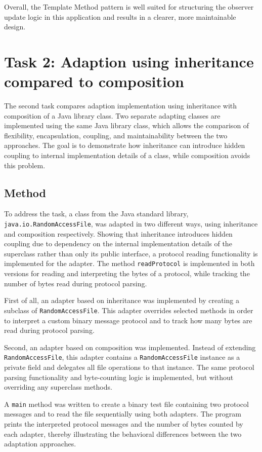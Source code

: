 \documentclass[a4paper]{scrartcl}
\begin{document}
Overall, the Template Method pattern is well suited for structuring the observer update logic in this application and results in a clearer, more maintainable design.

\section{Task 2: Adaption using inheritance compared to composition}

The second task compares adaption implementation using inheritance with composition of a Java library class. Two separate adapting classes are implemented using the same Java library class, which allows the comparison of flexibility, encapsulation, coupling, and maintainability between the two approaches. The goal is to demonstrate how inheritance can introduce hidden coupling to internal implementation details of a class, while composition avoids this problem. 

\subsection{Method}
To address the task, a class from the Java standard library, \texttt{java.io.RandomAccessFile}, was adapted in two different ways, using inheritance and composition respectively. Showing that inheritance introduces hidden coupling due to dependency on the internal implementation details of the superclass rather than only its public interface, a protocol reading functionality is implemented for the adapter. The method \texttt{readProtocol} is implemented in both versions for reading and interpreting the bytes of a protocol, while tracking the number of bytes read during protocol parsing. 

First of all, an adapter based on inheritance was implemented by creating a subclass of \texttt{RandomAccessFile}. This adapter overrides selected methods in order to interpret a custom binary message protocol and to track how many bytes are read during protocol parsing.

Second, an adapter based on composition was implemented. Instead of extending \texttt{RandomAccessFile}, this adapter contains a \texttt{RandomAccessFile} instance as a private field and delegates all file operations to that instance. The same protocol parsing functionality and byte-counting logic is implemented, but without overriding any superclass methods.

A \texttt{main} method was written to create a binary test file containing two protocol messages and to read the file sequentially using both adapters. The program prints the interpreted protocol messages and the number of bytes counted by each adapter, thereby illustrating the behavioral differences between the two adaptation approaches.
\end{document}
